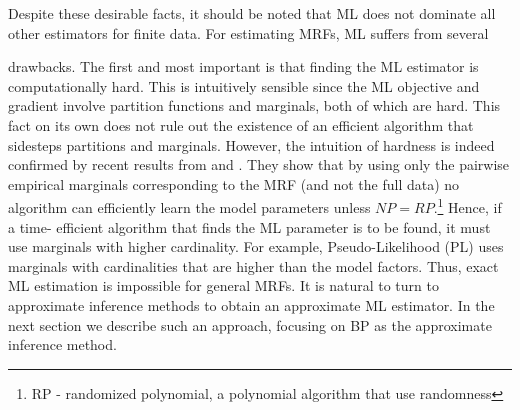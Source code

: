 Despite these desirable facts, it should be noted that ML does not dominate all other estimators for finite data.
For estimating MRFs, ML suffers from several  drawbacks. The first and most important is that finding the ML estimator is computationally hard. This is intuitively sensible since the ML objective and gradient involve partition functions and marginals, both of which are hard. This fact on its own does not rule out the existence of an efficient algorithm that sidesteps partitions and marginals.
However, the intuition of hardness is indeed confirmed by recent results from \cite{bresler2014hardness} and \cite{montanari2015computational}.
They show that by using only the pairwise empirical marginals corresponding to the MRF (and not the full data) no algorithm can efficiently learn the model parameters unless  $NP = RP$.\footnote{RP - randomized polynomial, a polynomial algorithm that use randomness}
Hence, if a time- efficient algorithm that finds the ML parameter is to be found, it must use marginals with higher cardinality.
For example, Pseudo-Likelihood (PL) uses marginals with cardinalities that are higher than the model factors.
Thus, exact ML estimation is impossible for general MRFs.
It is natural to turn to approximate inference methods to obtain an approximate ML estimator.
In the next section we describe such an approach, focusing on BP as the approximate inference method.

